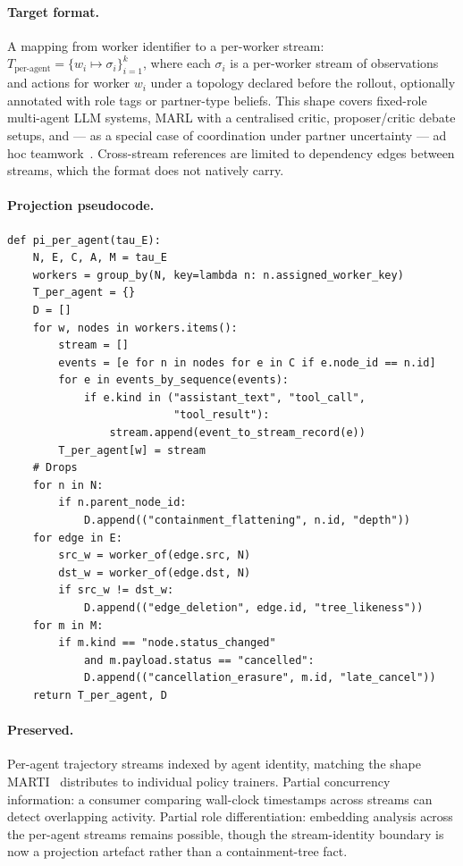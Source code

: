 \documentclass{article}
\begin{document}
\paragraph{Target format.} A mapping from worker identifier to a
per-worker stream:
$T_{\text{per-agent}} = \{ w_i \mapsto \sigma_i \}_{i=1}^{k}$,
where each $\sigma_i$ is a per-worker stream of observations and
actions for worker $w_i$ under a topology declared before the
rollout, optionally annotated with role tags or partner-type
beliefs. This shape covers fixed-role multi-agent LLM systems,
MARL with a centralised critic, proposer/critic debate setups,
and --- as a special case of coordination under partner
uncertainty --- ad hoc teamwork~\citep{mirsky2022aht,wang2024naht}.
Cross-stream references are limited to dependency edges between
streams, which the format does not natively carry.

\paragraph{Projection pseudocode.}
\begin{lstlisting}
def pi_per_agent(tau_E):
    N, E, C, A, M = tau_E
    workers = group_by(N, key=lambda n: n.assigned_worker_key)
    T_per_agent = {}
    D = []
    for w, nodes in workers.items():
        stream = []
        events = [e for n in nodes for e in C if e.node_id == n.id]
        for e in events_by_sequence(events):
            if e.kind in ("assistant_text", "tool_call",
                          "tool_result"):
                stream.append(event_to_stream_record(e))
        T_per_agent[w] = stream
    # Drops
    for n in N:
        if n.parent_node_id:
            D.append(("containment_flattening", n.id, "depth"))
    for edge in E:
        src_w = worker_of(edge.src, N)
        dst_w = worker_of(edge.dst, N)
        if src_w != dst_w:
            D.append(("edge_deletion", edge.id, "tree_likeness"))
    for m in M:
        if m.kind == "node.status_changed"
            and m.payload.status == "cancelled":
            D.append(("cancellation_erasure", m.id, "late_cancel"))
    return T_per_agent, D
\end{lstlisting}

\paragraph{Preserved.} Per-agent trajectory streams indexed by
agent identity, matching the shape MARTI~\citep{marti2025}
distributes to individual policy trainers. Partial concurrency
information: a consumer comparing wall-clock timestamps across
streams can detect overlapping activity. Partial role
differentiation: embedding analysis across the per-agent streams
remains possible, though the stream-identity boundary is now a
projection artefact rather than a containment-tree fact.
\end{document}
